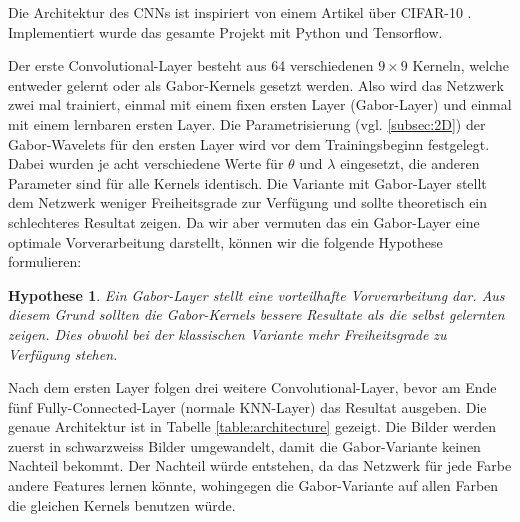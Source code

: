 Die Architektur des CNNs ist inspiriert von einem Artikel über CIFAR-10 \cite{online:cifar10}.
Implementiert wurde das gesamte Projekt mit Python und Tensorflow.

Der erste Convolutional-Layer besteht aus $64$ verschiedenen $9 \times 9$ Kerneln, welche entweder gelernt oder als Gabor-Kernels gesetzt werden.
Also wird das Netzwerk zwei mal trainiert, einmal mit einem fixen ersten Layer (Gabor-Layer) und einmal mit einem lernbaren ersten Layer.
Die Parametrisierung (vgl. \ref{subsec:2D}) der Gabor-Wavelets für den ersten Layer wird vor dem Trainingsbeginn festgelegt.
Dabei wurden je acht verschiedene Werte für $\theta$ und $\lambda$ eingesetzt, die anderen Parameter sind für alle Kernels identisch.
Die Variante mit Gabor-Layer stellt dem Netzwerk weniger Freiheitsgrade zur Verfügung und sollte theoretisch ein schlechteres Resultat zeigen.
Da wir aber vermuten das ein Gabor-Layer eine optimale Vorverarbeitung darstellt, können wir die folgende Hypothese formulieren:
\newtheorem{hypothese}{Hypothese}
\begin{hypothese}\label{hyp:1}
	 Ein Gabor-Layer stellt eine vorteilhafte Vorverarbeitung dar.
	 Aus diesem Grund sollten die Gabor-Kernels bessere Resultate als die selbst gelernten zeigen.
	 Dies obwohl bei der klassischen Variante mehr Freiheitsgrade zu Verfügung stehen.
\end{hypothese}

Nach dem ersten Layer folgen drei weitere Convolutional-Layer, bevor am Ende fünf Fully-Connected-Layer (normale KNN-Layer) das Resultat ausgeben.
Die genaue Architektur ist in Tabelle \ref{table:architecture} gezeigt.
Die Bilder werden zuerst in schwarzweiss Bilder umgewandelt, damit die Gabor-Variante keinen Nachteil bekommt.
Der Nachteil würde entstehen, da das Netzwerk für jede Farbe andere Features lernen könnte, wohingegen die Gabor-Variante auf allen Farben die gleichen Kernels benutzen würde. 

